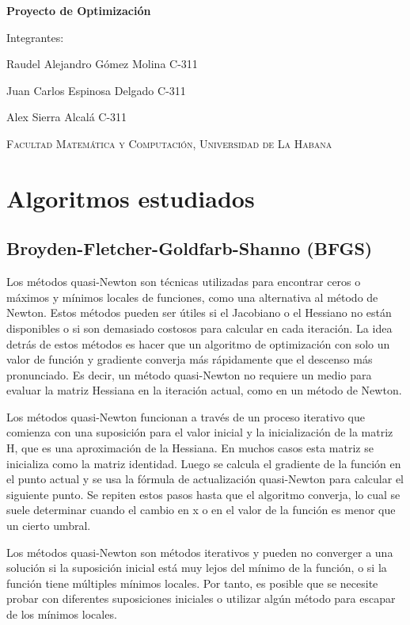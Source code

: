 \documentclass{article}
\begin{document}
\begin{titlepage}
	\centering
	{\bfseries\LARGE Proyecto de Optimización \par}
	\vspace{1cm}
	\vspace{1cm}
	{\LARGE Integrantes: \par}
	{\Large Raudel Alejandro Gómez Molina C-311 \par}
	{\Large Juan Carlos Espinosa Delgado C-311 \par}
	{\Large Alex Sierra Alcalá C-311 \par}
	\vfill
	{\scshape\Large Facultad Matemática y Computación, Universidad de La Habana \par}
\end{titlepage}

\section{Algoritmos estudiados}

\subsection{Broyden-Fletcher-Goldfarb-Shanno (BFGS)}

Los métodos quasi-Newton son técnicas utilizadas para encontrar ceros
o máximos y mínimos locales de funciones, como una alternativa al
método de Newton. Estos métodos pueden ser útiles si el Jacobiano o
el Hessiano no están disponibles o si son demasiado costosos para
calcular en cada iteración. La idea detrás de estos métodos es hacer
que un algoritmo de optimización con solo un valor de función y
gradiente converja más rápidamente que el descenso más pronunciado.
Es decir, un método quasi-Newton no requiere un medio para evaluar la
matriz Hessiana en la iteración actual, como en un método de Newton.

Los métodos quasi-Newton funcionan a través de un proceso iterativo
que comienza con una suposición para el valor inicial y la
inicialización de la matriz H, que es una aproximación de la
Hessiana. En muchos casos esta matriz se inicializa como la matriz
identidad. Luego se calcula el gradiente de la función en el punto actual
y se usa la fórmula de actualización quasi-Newton para calcular el
siguiente punto. Se repiten estos pasos hasta que el algoritmo
converja, lo cual se suele determinar cuando el cambio en x o en el
valor de la función es menor que un cierto umbral.

Los métodos quasi-Newton son métodos iterativos y pueden no converger
a una solución si la suposición inicial está muy lejos del mínimo de
la función, o si la función tiene múltiples mínimos locales. Por
tanto, es posible que se necesite probar con diferentes suposiciones
iniciales o utilizar algún método para escapar de los mínimos locales.
\end{document}
